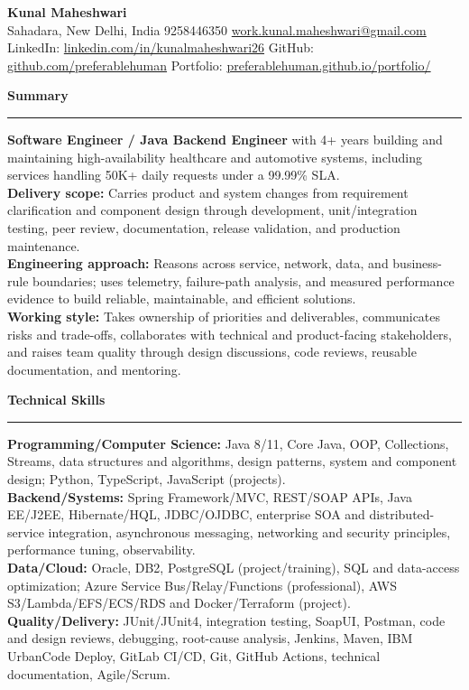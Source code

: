 \documentclass[11pt,letterpaper]{article}
\newcommand{\ressection}[1]{\Needspace{6\baselineskip}\vspace{8pt}\par\textbf{#1}\par\vspace{2pt}\hrule\vspace{5pt}}
\begin{document}
\pagestyle{empty}\raggedright\fontsize{11}{12.5}\selectfont

{\Large \textbf{Kunal Maheshwari}}\\
Sahadara, New Delhi, India \textbar{} 9258446350 \textbar{} \href{mailto:work.kunal.maheshwari@gmail.com}{work.kunal.maheshwari@gmail.com}\\
LinkedIn: \href{https://www.linkedin.com/in/kunalmaheshwari26}{linkedin.com/in/kunalmaheshwari26} \textbar{} GitHub: \href{https://github.com/preferablehuman}{github.com/preferablehuman} \textbar{} Portfolio: \href{https://preferablehuman.github.io/portfolio/}{preferablehuman.github.io/portfolio/}

\ressection{Summary}
\textbf{Software Engineer / Java Backend Engineer} with 4+ years building and maintaining high-availability healthcare and automotive systems, including services handling 50K+ daily requests under a 99.99\% SLA.\\[2pt]
\textbf{Delivery scope:} Carries product and system changes from requirement clarification and component design through development, unit/integration testing, peer review, documentation, release validation, and production maintenance.\\[2pt]
\textbf{Engineering approach:} Reasons across service, network, data, and business-rule boundaries; uses telemetry, failure-path analysis, and measured performance evidence to build reliable, maintainable, and efficient solutions.\\[2pt]
\textbf{Working style:} Takes ownership of priorities and deliverables, communicates risks and trade-offs, collaborates with technical and product-facing stakeholders, and raises team quality through design discussions, code reviews, reusable documentation, and mentoring.

\ressection{Technical Skills}
\textbf{Programming/Computer Science:} Java 8/11, Core Java, OOP, Collections, Streams, data structures and algorithms, design patterns, system and component design; Python, TypeScript, JavaScript (projects).\\
\textbf{Backend/Systems:} Spring Framework/MVC, REST/SOAP APIs, Java EE/J2EE, Hibernate/HQL, JDBC/OJDBC, enterprise SOA and distributed-service integration, asynchronous messaging, networking and security principles, performance tuning, observability.\\
\textbf{Data/Cloud:} Oracle, DB2, PostgreSQL (project/training), SQL and data-access optimization; Azure Service Bus/Relay/Functions (professional), AWS S3/Lambda/EFS/ECS/RDS and Docker/Terraform (project).\\
\textbf{Quality/Delivery:} JUnit/JUnit4, integration testing, SoapUI, Postman, code and design reviews, debugging, root-cause analysis, Jenkins, Maven, IBM UrbanCode Deploy, GitLab CI/CD, Git, GitHub Actions, technical documentation, Agile/Scrum.
\end{document}
